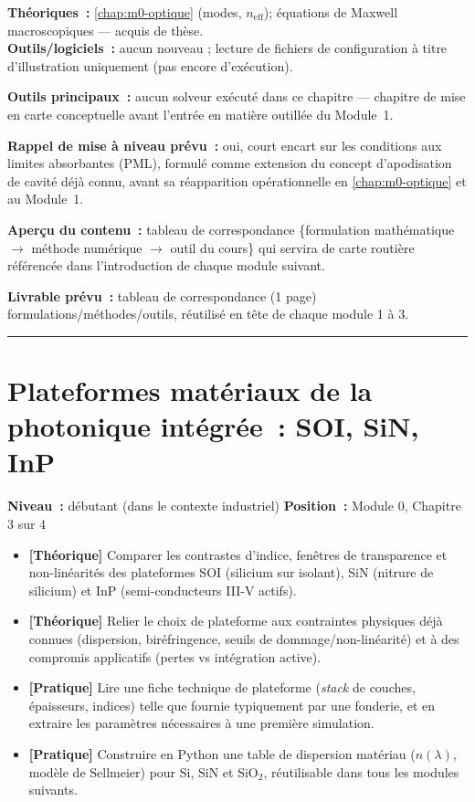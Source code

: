 \begin{prerequis}
\textbf{Théoriques~:} \cref{chap:m0-optique} (modes, $n_{\text{eff}}$); équations de Maxwell macroscopiques — acquis de thèse.\\
\textbf{Outils/logiciels~:} aucun nouveau ; lecture de fichiers de configuration à titre d'illustration uniquement (pas encore d'exécution).
\end{prerequis}

\noindent\textbf{Outils principaux~:} aucun solveur exécuté dans ce chapitre — chapitre de mise en carte conceptuelle avant l'entrée en matière outillée du Module~1.

\noindent\textbf{Rappel de mise à niveau prévu~:} oui, court encart sur les conditions aux limites absorbantes (PML), formulé comme extension du concept d'apodisation de cavité déjà connu, avant sa réapparition opérationnelle en \cref{chap:m0-optique} et au Module~1.

\noindent\textbf{Aperçu du contenu~:} tableau de correspondance \{formulation mathématique $\to$ méthode numérique $\to$ outil du cours\} qui servira de \og carte routière\fg{} référencée dans l'introduction de chaque module suivant.

\noindent\textbf{Livrable prévu~:} tableau de correspondance (1 page) formulations/méthodes/outils, réutilisé en tête de chaque module 1 à 3.

\bigskip
\hrule
\bigskip

\chapter{Plateformes matériaux de la photonique intégrée~: SOI, SiN, InP}
\label{chap:m0-materiaux}

\noindent\textbf{Niveau~:} débutant (dans le contexte industriel) \hfill
\textbf{Position~:} Module 0, Chapitre 3 sur 4

\begin{objectifs}
\begin{itemize}[leftmargin=1.4em]
  \item \textbf{[Théorique]} Comparer les contrastes d'indice, fenêtres de transparence et non-linéarités des plateformes SOI (silicium sur isolant), SiN (nitrure de silicium) et InP (semi-conducteurs III-V actifs).
  \item \textbf{[Théorique]} Relier le choix de plateforme aux contraintes physiques déjà connues (dispersion, biréfringence, seuils de dommage/non-linéarité) et à des compromis applicatifs (pertes vs intégration active).
  \item \textbf{[Pratique]} Lire une fiche technique de plateforme (\emph{stack} de couches, épaisseurs, indices) telle que fournie typiquement par une fonderie, et en extraire les paramètres nécessaires à une première simulation.
  \item \textbf{[Pratique]} Construire en Python une table de dispersion matériau ($n(\lambda)$, modèle de Sellmeier) pour Si, SiN et SiO$_2$, réutilisable dans tous les modules suivants.
\end{itemize}
\end{objectifs}


